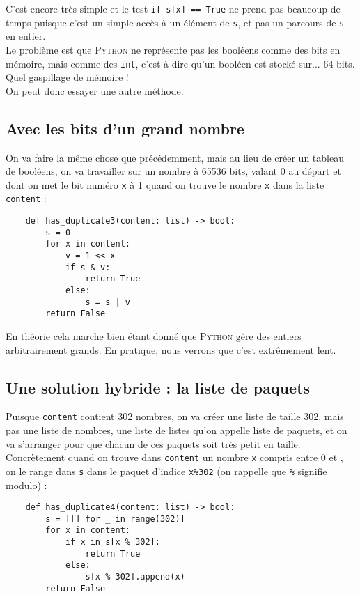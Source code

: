 \documentclass[a4paper,10pt,cours]{nsi}
\begin{document}
C'est encore très simple et le test \texttt{if s[x] == True} ne prend pas beaucoup de temps puisque c'est un simple accès à un élément de \texttt{s}, et pas un parcours de \texttt{s} en entier.\\
Le problème est que \textsc{Python} ne représente pas les booléens comme des bits en mémoire, mais comme des \texttt{int}, c'est-à dire qu'un booléen est stocké sur... 64 bits. Quel gaspillage de mémoire !\\
On peut donc essayer une autre méthode.

\subsection{Avec les bits d'un grand nombre}

On va faire la même chose que précédemment, mais au lieu de créer un tableau de  booléens, on va travailler sur un nombre à 65536 bits, valant 0 au départ et dont on met le bit numéro \texttt{x} à 1 quand on trouve le nombre \texttt{x} dans la liste \texttt{content} :
\begin{pyc}
    \begin{verbatim}
    def has_duplicate3(content: list) -> bool:
        s = 0
        for x in content:
            v = 1 << x
            if s & v:
                return True
            else:
                s = s | v
        return False
\end{verbatim}
\end{pyc}
En théorie cela marche bien étant donné que \textsc{Python} gère des entiers arbitrairement grands. En pratique, nous verrons que c'est extrêmement lent.

\subsection{Une solution hybride : la liste de paquets}

Puisque \texttt{content} contient 302 nombres, on va créer une liste de taille 302, mais pas une liste de nombres, une liste de listes qu'on appelle liste de paquets, et on va s'arranger pour que chacun de ces paquets soit très petit en taille. Concrètement quand on trouve dans \texttt{content} un nombre \texttt{x} compris entre 0 et , on le range dans \texttt{s} dans le paquet d'indice \texttt{x\%302} (on rappelle que \texttt{\%} signifie modulo) :

\begin{pyc}
    \begin{verbatim}
    def has_duplicate4(content: list) -> bool:
        s = [[] for _ in range(302)]
        for x in content:
            if x in s[x % 302]:
                return True
            else:
                s[x % 302].append(x)
        return False
\end{verbatim}
\end{pyc}
\end{document}
